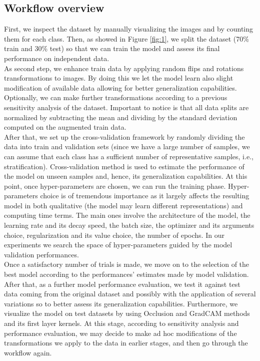 \subsection{Workflow overview}
First, we inspect the dataset by manually visualizing the images and by counting them for each class. Then, as showed in Figure \ref{fig:1}, we split the dataset (70\% train and 30\% test) so that we can train the model and assess its final performance on independent data.
\\\indent
As second step, we enhance train data by applying random flips and rotations transformations to images. By doing this we let the model learn also slight modification of available data allowing for better generalization capabilities. Optionally, we can make further transformations according to a previous sensitivity analysis of the dataset. Important to notice is that all data splits are normalized by subtracting the mean and dividing by the standard deviation computed on the augmented train data.
\\\indent
After that, we set up the cross-validation framework by randomly dividing the data into train and validation sets (since we have a large number of samples, we can assume that each class has a sufficient number of representative samples, i.e., stratification). Cross-validation method is used to estimate the performance of the model on unseen samples and, hence, its generalization capabilities. At this point, once hyper-parameters are chosen, we can run the training phase. Hyper-parameters choice is of tremendous importance as it largely affects the resulting model in both qualitative (the model may learn different representations) and computing time terms. The main ones involve the architecture of the model, the learning rate and its decay speed, the batch size, the optimizer and its arguments choice, regularization and its value choice, the number of epochs. In our experiments we search the space of hyper-parameters guided by the model validation performances.
\\\indent
Once a satisfactory number of trials is made, we move on to the selection of the best model according to the performances' estimates made by model validation. After that, as a further model performance evaluation, we test it against test data coming from the original dataset and possibly with the application of several  variations so to better assess its generalization capabilities. Furthermore, we visualize the model on test datasets by using Occlusion and GradCAM methods and its first layer kernels. At this stage, according to sensitivity analysis and performance evaluation, we may decide to make ad hoc modifications of the transformations we apply to the data in earlier stages, and then go through the workflow again.
